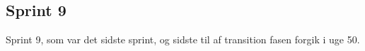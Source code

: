 \documentclass[Main.tex]{subfiles}
\begin{document}
\subsection{Sprint 9}
Sprint 9, som var det sidste sprint, og sidste til af transition fasen forgik i uge 50.
\end{document}
